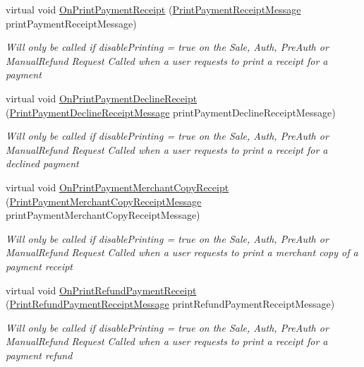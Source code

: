 \begin{DoxyCompactItemize}
virtual void \hyperlink{classcom_1_1clover_1_1remotepay_1_1sdk_1_1_default_clover_connector_listener_aeb819ef1568aac6bfdb54de3e8823685}{On\+Print\+Payment\+Receipt} (\hyperlink{classcom_1_1clover_1_1remotepay_1_1sdk_1_1_print_payment_receipt_message}{Print\+Payment\+Receipt\+Message} print\+Payment\+Receipt\+Message)
\begin{DoxyCompactList}\small\item\em Will only be called if disable\+Printing = true on the Sale, Auth, Pre\+Auth or Manual\+Refund Request Called when a user requests to print a receipt for a payment \end{DoxyCompactList}\item 
virtual void \hyperlink{classcom_1_1clover_1_1remotepay_1_1sdk_1_1_default_clover_connector_listener_a5c37faa1b2fd5dfc6c5ea0aa85c32d50}{On\+Print\+Payment\+Decline\+Receipt} (\hyperlink{classcom_1_1clover_1_1remotepay_1_1sdk_1_1_print_payment_decline_receipt_message}{Print\+Payment\+Decline\+Receipt\+Message} print\+Payment\+Decline\+Receipt\+Message)
\begin{DoxyCompactList}\small\item\em Will only be called if disable\+Printing = true on the Sale, Auth, Pre\+Auth or Manual\+Refund Request Called when a user requests to print a receipt for a declined payment \end{DoxyCompactList}\item 
virtual void \hyperlink{classcom_1_1clover_1_1remotepay_1_1sdk_1_1_default_clover_connector_listener_a308bf50f9fbf9bb6ec0955adde11a429}{On\+Print\+Payment\+Merchant\+Copy\+Receipt} (\hyperlink{classcom_1_1clover_1_1remotepay_1_1sdk_1_1_print_payment_merchant_copy_receipt_message}{Print\+Payment\+Merchant\+Copy\+Receipt\+Message} print\+Payment\+Merchant\+Copy\+Receipt\+Message)
\begin{DoxyCompactList}\small\item\em Will only be called if disable\+Printing = true on the Sale, Auth, Pre\+Auth or Manual\+Refund Request Called when a user requests to print a merchant copy of a payment receipt \end{DoxyCompactList}\item 
virtual void \hyperlink{classcom_1_1clover_1_1remotepay_1_1sdk_1_1_default_clover_connector_listener_a13de716522e58beb9af010207e7362f2}{On\+Print\+Refund\+Payment\+Receipt} (\hyperlink{classcom_1_1clover_1_1remotepay_1_1sdk_1_1_print_refund_payment_receipt_message}{Print\+Refund\+Payment\+Receipt\+Message} print\+Refund\+Payment\+Receipt\+Message)
\begin{DoxyCompactList}\small\item\em Will only be called if disable\+Printing = true on the Sale, Auth, Pre\+Auth or Manual\+Refund Request Called when a user requests to print a receipt for a payment refund \end{DoxyCompactList}\item 

\end{DoxyCompactItemize}
